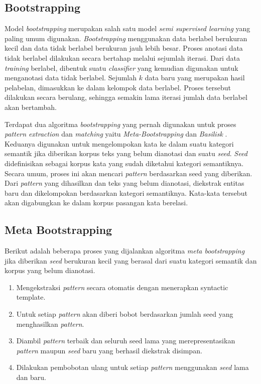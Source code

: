 \subsection{Bootstrapping}
Model \textit{bootstrapping} merupakan salah satu model \textit{semi supervised learning} yang paling umum digunakan. \textit{Bootstrapping} menggunakan data berlabel berukuran kecil dan data tidak berlabel berukuran jauh lebih besar. Proses anotasi data tidak berlabel dilakukan secara bertahap melalui sejumlah iterasi. Dari data \textit{training} berlabel, dibentuk suatu \textit{classifier} yang kemudian digunakan untuk menganotasi data tidak berlabel. Sejumlah $k$ data baru yang merupakan hasil pelabelan, dimasukkan ke dalam kelompok data berlabel. Proses tersebut dilakukan secara berulang, sehingga semakin lama iterasi jumlah data berlabel akan bertambah. 

Terdapat dua algoritma \textit{bootstrapping} yang pernah digunakan untuk proses \textit{pattern extraction} dan \textit{matching} yaitu \textit{Meta-Bootstrapping} dan \textit{Basilisk} \citep{riloff2003learning}. Keduanya digunakan untuk mengelompokan kata ke dalam suatu kategori semantik jika diberikan korpus teks yang belum dianotasi dan suatu \textit{seed}. \textit{Seed} didefinisikan sebagai korpus kata yang sudah diketahui kategori semantiknya. Secara umum, proses ini akan mencari \textit{pattern} berdasarkan seed yang diberikan. Dari \textit{pattern} yang dihasilkan dan teks yang belum dianotasi, diekstrak entitas baru dan dikelompokan berdasarkan kategori semantiknya. Kata-kata tersebut akan digabungkan ke dalam korpus pasangan kata berelasi.

\subsection{Meta Bootstrapping}
Berikut adalah beberapa proses \citep{riloff1999learning} yang dijalankan algoritma \textit{meta bootstrapping} jika diberikan \textit{seed} berukuran kecil yang berasal dari suatu kategori semantik dan korpus yang belum dianotasi.
\begin{enumerate}
  \item Mengekstraksi \textit{pattern} secara otomatis dengan menerapkan syntactic template.
  \item Untuk setiap \textit{pattern} akan diberi bobot berdasarkan jumlah seed yang menghasilkan \textit{pattern}.
  \item Diambil \textit{pattern} terbaik dan seluruh seed lama yang merepresentasikan \textit{pattern} maupun \textit{seed} baru yang berhasil diekstrak disimpan.
  \item Dilakukan pembobotan ulang untuk setiap \textit{pattern} menggunakan \textit{seed} lama dan baru.
\end{enumerate}

